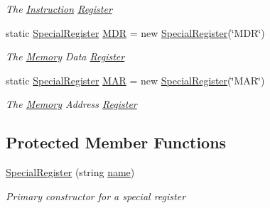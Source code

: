\begin{DoxyCompactItemize}
\begin{DoxyCompactList}\small\item\em The \hyperlink{class_c_p_u___o_s___simulator_1_1_c_p_u_1_1_instruction}{Instruction} \hyperlink{class_c_p_u___o_s___simulator_1_1_c_p_u_1_1_register}{Register} \end{DoxyCompactList}\item 
static \hyperlink{class_c_p_u___o_s___simulator_1_1_c_p_u_1_1_special_register}{Special\+Register} \hyperlink{class_c_p_u___o_s___simulator_1_1_c_p_u_1_1_special_register_aabf7c761e1f8a9994b7c0b131c53924d}{M\+D\+R} = new \hyperlink{class_c_p_u___o_s___simulator_1_1_c_p_u_1_1_special_register}{Special\+Register}(\char`\"{}M\+D\+R\char`\"{})
\begin{DoxyCompactList}\small\item\em The \hyperlink{namespace_c_p_u___o_s___simulator_1_1_memory}{Memory} Data \hyperlink{class_c_p_u___o_s___simulator_1_1_c_p_u_1_1_register}{Register} \end{DoxyCompactList}\item 
static \hyperlink{class_c_p_u___o_s___simulator_1_1_c_p_u_1_1_special_register}{Special\+Register} \hyperlink{class_c_p_u___o_s___simulator_1_1_c_p_u_1_1_special_register_a2ae89cee8b74f9985f43ee4e6f994bad}{M\+A\+R} = new \hyperlink{class_c_p_u___o_s___simulator_1_1_c_p_u_1_1_special_register}{Special\+Register}(\char`\"{}M\+A\+R\char`\"{})
\begin{DoxyCompactList}\small\item\em The \hyperlink{namespace_c_p_u___o_s___simulator_1_1_memory}{Memory} Address \hyperlink{class_c_p_u___o_s___simulator_1_1_c_p_u_1_1_register}{Register} \end{DoxyCompactList}\end{DoxyCompactItemize}
\subsection*{Protected Member Functions}
\begin{DoxyCompactItemize}
\item 
\hyperlink{class_c_p_u___o_s___simulator_1_1_c_p_u_1_1_special_register_a0328b3388027aa409a68191685753f4a}{Special\+Register} (string \hyperlink{class_c_p_u___o_s___simulator_1_1_c_p_u_1_1_special_register_ac521aef66f5fe6a88486e70f5ade8326}{name})
\begin{DoxyCompactList}\small\item\em Primary constructor for a special register \end{DoxyCompactList}\end{DoxyCompactItemize}

